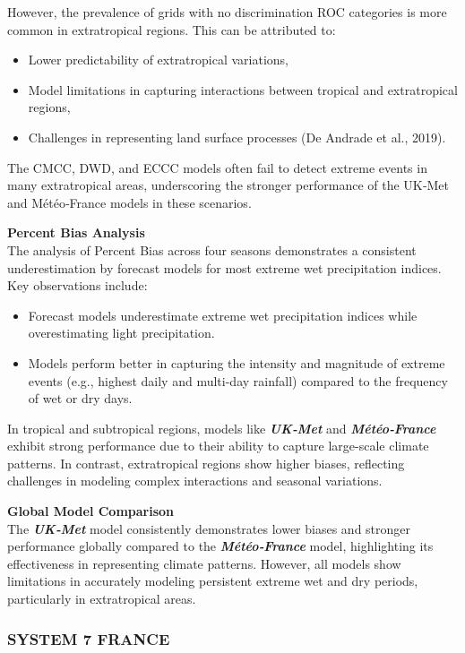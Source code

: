 However, the prevalence of grids with no discrimination ROC categories is more common in extratropical regions. This can be attributed to:
\begin{itemize}
    \item Lower predictability of extratropical variations,
    \item Model limitations in capturing interactions between tropical and extratropical regions,
    \item Challenges in representing land surface processes (De Andrade et al., 2019).
\end{itemize}
The CMCC, DWD, and ECCC models often fail to detect extreme events in many extratropical areas, underscoring the stronger performance of the UK‐Met and Météo‐France models in these scenarios.

\textbf{Percent Bias Analysis}\\
The analysis of Percent Bias across four seasons demonstrates a consistent underestimation by forecast models for most extreme wet precipitation indices. Key observations include:
\begin{itemize}
    \item Forecast models underestimate extreme wet precipitation indices while overestimating light precipitation.
    \item Models perform better in capturing the intensity and magnitude of extreme events (e.g., highest daily and multi-day rainfall) compared to the frequency of wet or dry days.
\end{itemize}

In tropical and subtropical regions, models like \textbf{\textit{UK‐Met}}  and \textbf{\textit{Météo‐France} } exhibit strong performance due to their ability to capture large-scale climate patterns. In contrast, extratropical regions show higher biases, reflecting challenges in modeling complex interactions and seasonal variations.

\textbf{Global Model Comparison}\\
The \textbf{\textit{UK‐Met}} model consistently demonstrates lower biases and stronger performance globally compared to the \textbf{\textit{Météo‐France} }  model, highlighting its effectiveness in representing climate patterns. However, all models show limitations in accurately modeling persistent extreme wet and dry periods, particularly in extratropical areas.


\subsubsection{SYSTEM 7 FRANCE}

